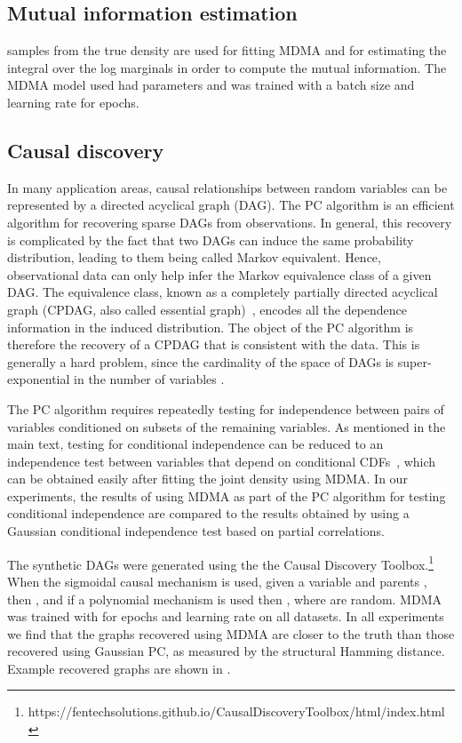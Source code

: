 \documentclass{article}
\begin{document}
\subsection{Mutual information estimation}
 samples from the true density are used for fitting MDMA and for estimating the integral over the log marginals in order to compute the mutual information. The MDMA model used had parameters  and was trained with a batch size  and learning rate  for  epochs. 

\subsection{Causal discovery} \label{app:exp_details_CD}

In many application areas, causal relationships between random variables can be represented by a directed acyclical graph (DAG).
The PC algorithm \cite{Spirtes2000} is an efficient algorithm for recovering sparse DAGs from observations.
In general, this recovery is complicated by the fact that two DAGs can induce the same probability distribution, leading to them being called Markov equivalent.
Hence, observational data can only help infer the Markov equivalence class of a given DAG.
The equivalence class, known as a completely partially directed acyclical graph (CPDAG, also called essential graph)~\cite{chickering2002learning}, encodes all the dependence information in the induced distribution.
The object of the PC algorithm is therefore the recovery of a CPDAG that is consistent with the data.
This is generally a hard problem, since the cardinality of the space of DAGs is super-exponential in the number of variables \cite{robinson1977counting}. 

The PC algorithm requires repeatedly testing for independence between pairs of variables conditioned on subsets of the remaining variables.
As mentioned in the main text, testing for conditional independence can be reduced to an independence test between variables that depend on conditional 
CDFs~\cite{petersen2021testing}, which can be obtained easily after fitting the joint density using MDMA.
In our experiments, the results of using MDMA as part of the PC algorithm for testing conditional independence are compared to the results obtained by using a Gaussian conditional independence test based on partial correlations. 

The synthetic DAGs were generated using the the Causal Discovery Toolbox.\footnote{https://fentechsolutions.github.io/CausalDiscoveryToolbox/html/index.html} When the sigmoidal causal mechanism is used, given a variable  and parents , then , and if a polynomial mechanism is used then , where  are random. MDMA was trained with  for  epochs and learning rate  on all datasets. In all experiments we find that the graphs recovered using MDMA are closer to the truth than those recovered using Gaussian PC, as measured by the structural Hamming distance. Example recovered graphs are shown in . 
\end{document}
